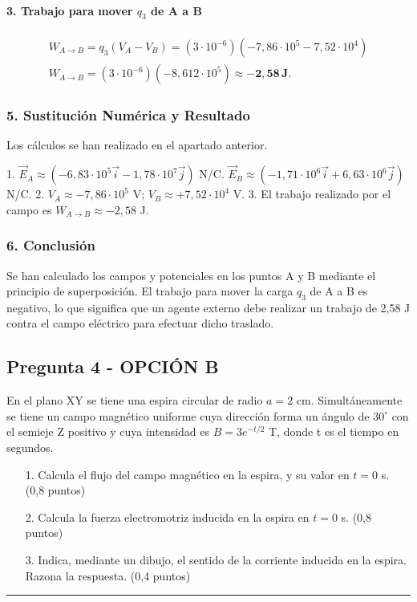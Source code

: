 \paragraph*{3. Trabajo para mover $q_3$ de A a B}
\begin{gather}
    W_{A \to B} = q_3(V_A - V_B) = (3\cdot10^{-6})(-7,86\cdot10^5 - 7,52\cdot10^4) \\
    W_{A \to B} = (3\cdot10^{-6})(-8,612\cdot10^5) \approx \boldsymbol{-2,58} \, \textbf{J}.
\end{gather}

\subsubsection*{5. Sustitución Numérica y Resultado}
Los cálculos se han realizado en el apartado anterior.
\begin{cajaresultado}
1. $\vec{E}_A \approx (-6,83\cdot10^5\vec{i} - 1,78\cdot10^7\vec{j})$ N/C.
   $\vec{E}_B \approx (-1,71\cdot10^6\vec{i} + 6,63\cdot10^6\vec{j})$ N/C.
2. $V_A \approx -7,86 \cdot 10^5$ V; $V_B \approx +7,52 \cdot 10^4$ V.
3. El trabajo realizado por el campo es $W_{A \to B} \approx -2,58$ J.
\end{cajaresultado}

\subsubsection*{6. Conclusión}
\begin{cajaconclusion}
Se han calculado los campos y potenciales en los puntos A y B mediante el principio de superposición. El trabajo para mover la carga $q_3$ de A a B es negativo, lo que significa que un agente externo debe realizar un trabajo de 2,58 J contra el campo eléctrico para efectuar dicho traslado.
\end{cajaconclusion}

\newpage

\subsection{Pregunta 4 - OPCIÓN B}
\label{subsec:4B_2003_jun_ord}

\begin{cajaenunciado}
En el plano XY se tiene una espira circular de radio $a=2$ cm. Simultáneamente se tiene un campo magnético uniforme cuya dirección forma un ángulo de $30^\circ$ con el semieje Z positivo y cuya intensidad es $B=3e^{-t/2}$ T, donde t es el tiempo en segundos.
\begin{enumerate}
    \item[1.] Calcula el flujo del campo magnético en la espira, y su valor en $t=0$ s. (0,8 puntos)
    \item[2.] Calcula la fuerza electromotriz inducida en la espira en $t=0$ s. (0,8 puntos)
    \item[3.] Indica, mediante un dibujo, el sentido de la corriente inducida en la espira. Razona la respuesta. (0,4 puntos)
\end{enumerate}
\end{cajaenunciado}
\hrule

